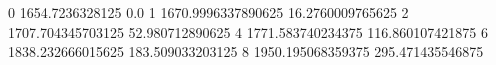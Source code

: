 0 1654.7236328125 0.0
1 1670.9996337890625 16.2760009765625
2 1707.704345703125 52.980712890625
4 1771.583740234375 116.860107421875
6 1838.232666015625 183.509033203125
8 1950.195068359375 295.471435546875
